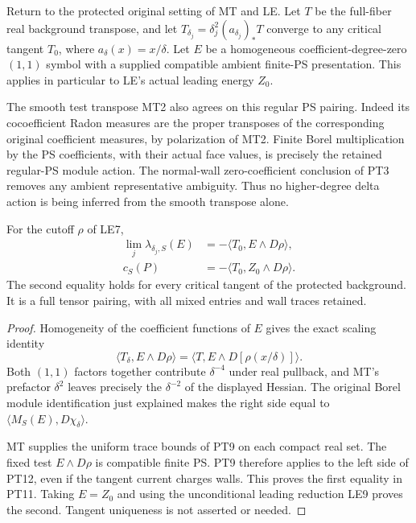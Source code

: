 Return to the protected original setting of MT and LE.
Let $T$ be the full-fiber real background transpose, and
let $T_{\delta_j}=\delta_j^2(a_{\delta_j})_*T$ converge
to any critical tangent $T_0$, where
$a_\delta(x)=x/\delta$.  Let $E$ be a homogeneous
coefficient-degree-zero $(1,1)$ symbol with a supplied
compatible ambient finite-PS presentation.  This applies
in particular to LE's actual leading energy $Z_0$.

The smooth test transpose MT2 also agrees on this regular
PS pairing.  Indeed its cocoefficient Radon measures are
the proper transposes of the corresponding original
coefficient measures, by polarization of MT2.  Finite
Borel multiplication by the PS coefficients, with their
actual face values, is precisely the retained regular-PS
module action.  The normal-wall zero-coefficient conclusion
of PT3 removes any ambient representative ambiguity.  Thus
no higher-degree delta action is being inferred from the
smooth transpose alone.

\begin{theorem}
\label{thm:r13-leading-tangent-pairing}
For the cutoff $\rho$ of LE7,
\[
 \begin{split}
 \lim_j\lambda_{\delta_j,S}(E)
       &=-\langle T_0,E\wedge D\rho\rangle,\\
 c_S(P)&=-\langle T_0,Z_0\wedge D\rho\rangle.
 \end{split}
 \tag{PT11}
\]
The second equality holds for every critical tangent of
the protected background.  It is a full tensor pairing,
with all mixed entries and wall traces retained.
\end{theorem}

\begin{proof}
Homogeneity of the coefficient functions of $E$ gives the
exact scaling identity
\[
 \langle T_\delta,E\wedge D\rho\rangle
       =\langle T,E\wedge D[\rho(x/\delta)]\rangle.
 \tag{PT12}
\]
Both $(1,1)$ factors together contribute $\delta^{-4}$
under real pullback, and MT's prefactor $\delta^2$
leaves precisely the $\delta^{-2}$ of the displayed
Hessian.  The original Borel module identification just
explained makes the right side equal to
$\langle M_S(E),D\chi_\delta\rangle$.

MT supplies the uniform trace bounds of PT9 on each
compact real set.  The fixed test $E\wedge D\rho$ is
compatible finite PS.  PT9 therefore applies to the left
side of PT12, even if the tangent current charges walls.
This proves the first equality in PT11.  Taking $E=Z_0$
and using the unconditional leading reduction LE9 proves
the second.  Tangent uniqueness is not asserted or needed.
\end{proof}

